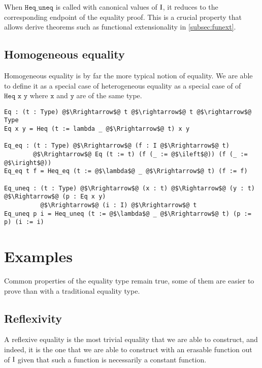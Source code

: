 \documentclass[12pt,twoside,maitrise]{dms}
\theoremstyle{definition}
\numberwithin{equation}{section}
\numberwithin{table}{chapter}
\numberwithin{figure}{chapter}
\newcommand\fn[1] {\texttt{#1}}
\begin{document}
When $\fn{Heq\_uneq}$ is called with canonical values of $\mathrm{I}$, it reduces to
the corresponding endpoint of the equality proof. This is a crucial property
that allows derive theorems such as functional extensionality in
\autoref{subsec:funext}.

\subsection{Homogeneous equality}
Homogeneous equality is by far the more typical notion of equality. We are able
to define it as a special case of heterogeneous equality as a special case of of
$\fn{Heq x y}$ where $\fn{x}$ and $\fn{y}$ are of the same type.

\begin{verbatim}
Eq : (t : Type) @$\Rrightarrow$@ t @$\rightarrow$@ t @$\rightarrow$@ Type
Eq x y = Heq (t := lambda _ @$\Rrightarrow$@ t) x y

Eq_eq : (t : Type) @$\Rrightarrow$@ (f : I @$\Rrightarrow$@ t)
        @$\Rrightarrow$@ Eq (t := t) (f (_ := @$\ileft$@)) (f (_ := @$\iright$@))
Eq_eq t f = Heq_eq (t := @$\lambda$@ _ @$\Rrightarrow$@ t) (f := f)

Eq_uneq : (t : Type) @$\Rrightarrow$@ (x : t) @$\Rightarrow$@ (y : t) @$\Rightarrow$@ (p : Eq x y)
          @$\Rrightarrow$@ (i : I) @$\Rrightarrow$@ t
Eq_uneq p i = Heq_uneq (t := @$\lambda$@ _ @$\Rrightarrow$@ t) (p := p) (i := i)
\end{verbatim}

\section{Examples}
Common properties of the equality type remain true, some of them are easier to prove than with a traditional equality type.

\subsection*{Reflexivity}
A reflexive equality is the most trivial equality that we are able to construct,
and indeed, it is the one that we are able to construct with an erasable
function out of $\mathrm{I}$ given that such a function is necessarily a constant
function.
\end{document}
